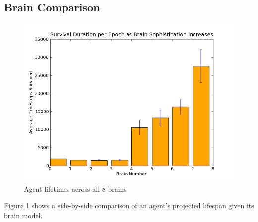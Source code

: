 \subsection{Brain Comparison}
\begin{figure}
\begin{center}
  \includegraphics[scale=.65]{plots/survive.png}
  \caption{Agent lifetimes across all 8 brains}
  \label{fig:survive}
\end{center}
\end{figure}

Figure \ref{fig:survive} shows a side-by-side comparison of an agent's 
projected lifespan given its brain model.
